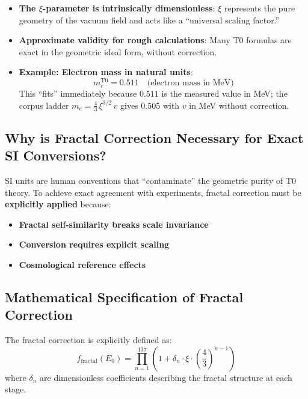 	\begin{itemize}
		\item \textbf{The $\xi$-parameter is intrinsically dimensionless}: $\xi$ represents the pure geometry of the vacuum field and acts like a ``universal scaling factor.''
		
		\item \textbf{Approximate validity for rough calculations}: Many T0 formulas are exact in the geometric ideal form, without correction.
		
		\item \textbf{Example: Electron mass in natural units}:
		\begin{equation}
			m_e^{\mathrm{T0}} = 0.511 \quad \text{(electron mass in MeV)}
		\end{equation}
		This ``fits'' immediately because $0.511$ is the measured value in MeV; the corpus ladder $m_e = \frac43\,\xi^{3/2}\,v$ gives $0.505$ with $v$ in MeV without correction.
	\end{itemize}
	
	\subsection{Why is Fractal Correction Necessary for Exact SI Conversions?}
	
	SI units are human conventions that ``contaminate'' the geometric purity of T0 theory. To achieve exact agreement with experiments, fractal correction must be \textbf{explicitly applied} because:
	
	\begin{itemize}
		\item \textbf{Fractal self-similarity breaks scale invariance}
		\item \textbf{Conversion requires explicit scaling}
		\item \textbf{Cosmological reference effects}
	\end{itemize}
	
	\subsection{Mathematical Specification of Fractal Correction}
	
	The fractal correction is explicitly defined as:
	\begin{equation}
		f_{\text{fractal}}(E_0) = \prod_{n=1}^{137} \left(1 + \delta_n \cdot \xi \cdot \left(\frac{4}{3}\right)^{n-1}\right)
	\end{equation}
	where $\delta_n$ are dimensionless coefficients describing the fractal structure at each stage.
	
